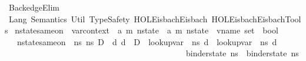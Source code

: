 %
\begin{isabellebody}%
%
%
\isadelimdocument
%
\endisadelimdocument
%
\isatagdocument
%
\isamarkuptrue%
%
\endisatagdocument
{\isafolddocument}%
%
\isadelimdocument
%
\endisadelimdocument
%
\isadelimtheory
%
\endisadelimtheory
%
\isatagtheory
{}\isamarkupfalse%
\ BackedgeElim\isanewline
{}\ Lang\ Semantics\ Util\ TypeSafety\ {\isachardoublequoteopen}HOL{\isacharminus}{\kern0pt}Eisbach{\isachardot}{\kern0pt}Eisbach{\isachardoublequoteclose}\ {\isachardoublequoteopen}HOL{\isacharminus}{\kern0pt}Eisbach{\isachardot}{\kern0pt}Eisbach{\isacharunderscore}{\kern0pt}Tools{\isachardoublequoteclose}\isanewline
{}%
\endisatagtheory
{\isafoldtheory}%
%
\isadelimtheory
%
\endisadelimtheory
%
\isadelimdocument
%
\endisadelimdocument
%
\isatagdocument
%
\isamarkuptrue%
%
\endisatagdocument
{\isafolddocument}%
%
\isadelimdocument
%
\endisadelimdocument
{}\isamarkupfalse%
\ nstate{\isacharunderscore}{\kern0pt}same{\isacharunderscore}{\kern0pt}on\ {\isacharcolon}{\kern0pt}{\isacharcolon}{\kern0pt}\ {\isachardoublequoteopen}var{\isacharunderscore}{\kern0pt}context\ {\isasymRightarrow}\ {\isacharparenleft}{\kern0pt}{\isacharprime}{\kern0pt}a{\isacharcomma}{\kern0pt}\ {\isacharprime}{\kern0pt}m{\isacharparenright}{\kern0pt}\ nstate\ {\isasymRightarrow}\ {\isacharparenleft}{\kern0pt}{\isacharprime}{\kern0pt}a{\isacharcomma}{\kern0pt}\ {\isacharprime}{\kern0pt}m{\isacharparenright}{\kern0pt}\ nstate\ {\isasymRightarrow}\ vname\ set\ {\isasymRightarrow}\ bool{\isachardoublequoteclose}\isanewline
\ \ \ {\isachardoublequoteopen}nstate{\isacharunderscore}{\kern0pt}same{\isacharunderscore}{\kern0pt}on\ {\isasymLambda}\ ns{}\ ns{}\ D\ {\isacharequal}{\kern0pt}\ {\isacharparenleft}{\kern0pt}{\isacharparenleft}{\kern0pt}{\isasymforall}d{\isachardot}{\kern0pt}\ d\ {\isasymnotin}\ D\ {\isasymlongrightarrow}\ lookup{\isacharunderscore}{\kern0pt}var\ {\isasymLambda}\ ns{}\ d\ {\isacharequal}{\kern0pt}\ lookup{\isacharunderscore}{\kern0pt}var\ {\isasymLambda}\ ns{}\ d{\isacharparenright}{\kern0pt}\ {\isasymand}\ \isanewline
\ \ \ \ \ \ \ \ \ \ \ \ \ \ \ \ \ \ \ \ \ \ \ \ \ \ \ \ \ \ \ \ \ \ \ \ \ \ \ \ \ \ \ \ binder{\isacharunderscore}{\kern0pt}state\ ns{}\ {\isacharequal}{\kern0pt}\ binder{\isacharunderscore}{\kern0pt}state\ ns{}\ {\isasymand}\isanewline

\end{isabellebody}
